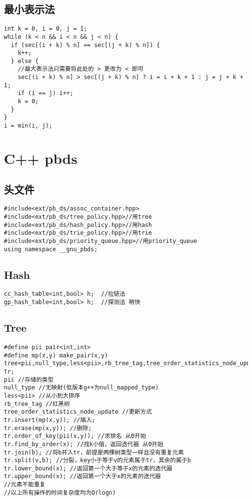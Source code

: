 \documentclass[twocolumn,a4]{article}
\begin{document}
\subsection{最小表示法}
\begin{lstlisting}
int k = 0, i = 0, j = 1;
while (k < n && i < n && j < n) {
  if (sec[(i + k) % n] == sec[(j + k) % n]) {
    k++;
  } else {
    //最大表示法只需要将此处的 > 更改为 < 即可
    sec[(i + k) % n] > sec[(j + k) % n] ? i = i + k + 1 : j = j + k + 1;
    if (i == j) i++;
    k = 0;
  }
}
i = min(i, j);
\end{lstlisting}
\section{C++ pbds}
\subsection{头文件}
\begin{lstlisting}
#include<ext/pb_ds/assoc_container.hpp>
#include<ext/pb_ds/tree_policy.hpp>//用tree
#include<ext/pb_ds/hash_policy.hpp>//用hash
#include<ext/pb_ds/trie_policy.hpp>//用trie
#include<ext/pb_ds/priority_queue.hpp>//用priority_queue
using namespace __gnu_pbds;
\end{lstlisting}
\subsection{Hash}
\begin{lstlisting}
cc_hash_table<int,bool> h;  //拉链法
gp_hash_table<int,bool> h;  //探测法 稍快
\end{lstlisting}
\subsection{Tree}
\begin{lstlisting}
#define pii pair<int,int>
#define mp(x,y) make_pair(x,y)
tree<pii,null_type,less<pii>,rb_tree_tag,tree_order_statistics_node_update> tr;
pii //存储的类型
null_type //无映射(低版本g++为null_mapped_type)
less<pii> //从小到大排序
rb_tree_tag //红黑树
tree_order_statistics_node_update //更新方式
tr.insert(mp(x,y)); //插入;
tr.erase(mp(x,y)); //删除;
tr.order_of_key(pii(x,y)); //求排名 从0开始
tr.find_by_order(x); //找k小值，返回迭代器 从0开始
tr.join(b); //将b并入tr，前提是两棵树类型一样且没有重复元素
tr.split(v,b); //分裂，key小于等于v的元素属于tr，其余的属于b
tr.lower_bound(x); //返回第一个大于等于x的元素的迭代器
tr.upper_bound(x); //返回第一个大于x的元素的迭代器
//元素不能重复
//以上所有操作的时间复杂度均为O(logn)
\end{lstlisting}
\end{document}
